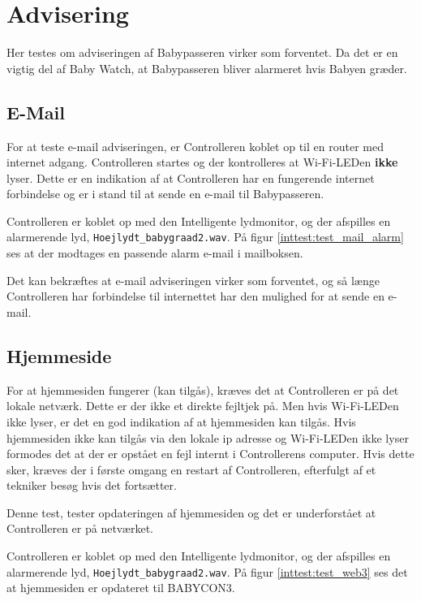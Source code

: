 \newpage
\section{Advisering}

Her testes om adviseringen af Babypasseren virker som forventet. Da det er en vigtig del af Baby Watch, at Babypasseren bliver alarmeret hvis Babyen græder.

\subsection*{E-Mail}

For at teste e-mail adviseringen, er Controlleren koblet op til en router med internet adgang. Controlleren startes og der kontrolleres at Wi-Fi-LEDen \textbf{ikke} lyser. Dette er en indikation af at Controlleren har en fungerende internet forbindelse og er i stand til at sende en e-mail til Babypasseren.

Controlleren er koblet op med den Intelligente lydmonitor, og der afspilles en alarmerende lyd, \verb+Hoejlydt_babygraad2.wav+. På figur \ref{inttest:test_mail_alarm} ses at der modtages en passende alarm e-mail i mailboksen.


Det kan bekræftes at e-mail adviseringen virker som forventet, og så længe Controlleren har forbindelse til internettet har den mulighed for at sende en e-mail.

\newpage
\subsection*{Hjemmeside}

For at hjemmesiden fungerer (kan tilgås), kræves det at Controlleren er på det lokale netværk. Dette er der ikke et direkte fejltjek på. Men hvis Wi-Fi-LEDen ikke lyser, er det en god indikation af at hjemmesiden kan tilgås. Hvis hjemmesiden ikke kan tilgås via den lokale ip adresse og Wi-Fi-LEDen ikke lyser formodes det at der er opstået en fejl internt i Controllerens computer. Hvis dette sker, kræves der i første omgang en restart af Controlleren, efterfulgt af et tekniker besøg hvis det fortsætter. 

Denne test, tester opdateringen af hjemmesiden og det er underforstået at Controlleren er på netværket.

Controlleren er koblet op med den Intelligente lydmonitor, og der afspilles en alarmerende lyd, \verb+Hoejlydt_babygraad2.wav+. På figur \ref{inttest:test_web3} ses det at hjemmesiden er opdateret til BABYCON3.

